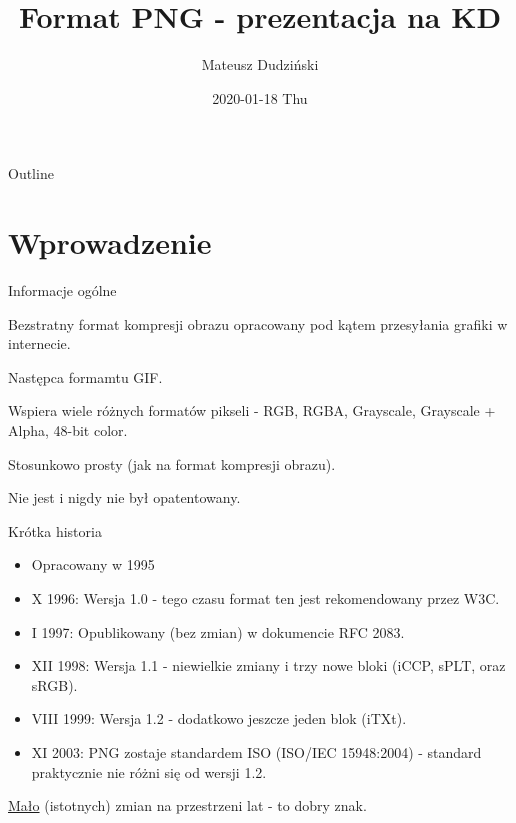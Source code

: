 \documentclass[presentation]{beamer}
\author{Mateusz Dudziński}
\date{2020-01-18 Thu}
\title{Format PNG - prezentacja na KD}
\begin{document}
\maketitle
\begin{frame}{Outline}
\setcounter{tocdepth}{1}
\tableofcontents
\end{frame}


\section{Wprowadzenie}
\label{sec:org82e0c61}
\begin{frame}[label={sec:org56d7ed2}]{Informacje ogólne}
\begin{block}{Bezstratny format kompresji obrazu opracowany pod kątem przesyłania grafiki w internecie.}
\end{block}
\begin{block}{Następca formamtu GIF.}
\end{block}
\begin{block}{Wspiera wiele różnych formatów pikseli - RGB, RGBA, Grayscale, Grayscale + Alpha, 48-bit color.}
\end{block}
\begin{block}{Stosunkowo prosty (jak na format kompresji obrazu).}
\end{block}
\begin{block}{Nie jest i nigdy nie był opatentowany.}
\end{block}
\end{frame}
\begin{frame}[label={sec:org7f8bf2b}]{Krótka historia}
\begin{itemize}
\item Opracowany w 1995
\item X 1996: Wersja 1.0 - tego czasu format ten jest rekomendowany przez W3C.
\item I 1997: Opublikowany (bez zmian) w dokumencie {\color{blue}RFC 2083}.
\item XII 1998: Wersja 1.1 - niewielkie zmiany i trzy nowe bloki ({\color{blue}iCCP}, {\color{blue}sPLT}, oraz {\color{blue}sRGB}).
\item VIII 1999: Wersja 1.2 - dodatkowo jeszcze jeden blok ({\color{blue}iTXt}).
\item XI 2003: PNG zostaje standardem ISO ({\color{blue}ISO/IEC 15948:2004}) - standard praktycznie nie różni się od wersji 1.2.
\end{itemize}
\vspace{0.5cm}
\uline{Mało} (istotnych) zmian na przestrzeni lat - to dobry znak.
\end{frame}
\end{document}
